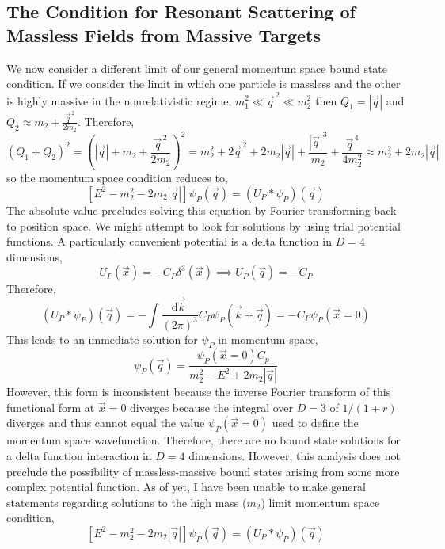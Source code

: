 \documentclass[12pt]{article}
\renewcommand{\d}[1]{ \mathrm{d}#1 \:}
\begin{document}
\subsection{The Condition for Resonant Scattering of Massless Fields from Massive Targets}

We now consider a different limit of our general momentum space bound state condition. If we consider the limit in which one particle is massless and the other is highly massive in the nonrelativistic regime, $m_1^2 \ll \vec{q}^{\, 2} \ll m_2^2$ then $Q_1 = |\vec{q}|$ and $Q_2 \approx m_2 + \frac{\vec{q}^{\, 2}}{2 m_2}$. Therefore,
\begin{equation}
(Q_1 + Q_2)^2 = \left( |\vec{q}| + m_2 + \frac{\vec{q}^{\, 2}}{2 m_2} \right)^2 = m_2^2 + 2\vec{q}^{\, 2} + 2m_2 |\vec{q}| + \frac{|\vec{q}|^3}{m_2} + \frac{\vec{q}^{\, 4}}{4 m_2^2}  \approx m_2^2 + 2 m_2 |\vec{q}|
\end{equation}
so the momentum space condition reduces to,
\begin{equation}
\left[E^2 - m_2^2 - 2 m_2 |\vec{q}| \right] \psi_P(\vec{q}) = (U_P * \psi_P)(\vec{q})
\end{equation}
The absolute value precludes solving this equation by Fourier transforming back to position space. We might attempt to look for solutions by using trial potential functions. A particularly convenient potential is a delta function in $D = 4$ dimensions,
\begin{equation}
U_P(\vec{x}) = -C_P \delta^3(\vec{x}) \implies U_P(\vec{q}) = -C_P
\end{equation}
Therefore, 
\begin{equation}
(U_P * \psi_P)(\vec{q}) = -\int \frac{\d{\vec{k}}}{(2\pi)^3} C_P \psi_P(\vec{k} + \vec{q}) = -C_P \psi_P(\vec{x} = 0)
\end{equation}
This leads to an immediate solution for $\psi_P$ in momentum space,
\begin{equation}
\psi_P(\vec{q}) = \frac{\psi_P(\vec{x} = 0) C_p}{m_2^2 - E^2 + 2 m_2 |\vec{q}|}
\end{equation}
However, this form is inconsistent because the inverse Fourier transform of this functional form at $\vec{x} = 0$ diverges because the integral over $D = 3$ of $1/(1+r)$ diverges and thus cannot equal the value $\psi_P(\vec{x} = 0)$ used to define the momentum space wavefunction. Therefore, there are no bound state solutions for a delta function interaction in $D = 4$ dimensions. However, this analysis does not preclude the possibility of massless-massive bound states arising from some more complex potential function. As of yet, I have been unable to make general statements regarding solutions to the high mass ($m_2$) limit momentum space condition,
\begin{equation}
\left[E^2 - m_2^2 - 2 m_2 |\vec{q}| \right] \psi_P(\vec{q}) = (U_P * \psi_P)(\vec{q})
\end{equation}

\nocite{*}


\end{document}
